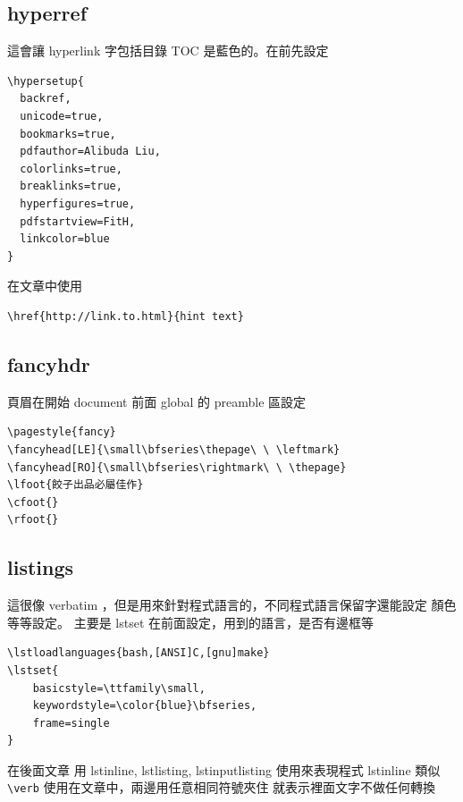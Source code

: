 \subsection{hyperref}
這會讓 hyperlink 字包括目錄 TOC 是藍色的。在\verb==前先設定
\begin{verbatim}
\hypersetup{
  backref,
  unicode=true,
  bookmarks=true,
  pdfauthor=Alibuda Liu,
  colorlinks=true,
  breaklinks=true,
  hyperfigures=true,
  pdfstartview=FitH,
  linkcolor=blue
}
\end{verbatim}
在文章中使用
\begin{verbatim}
\href{http://link.to.html}{hint text}
\end{verbatim}

\subsection{fancyhdr}
頁眉在開始 document 前面 global 的 preamble 區設定
\begin{verbatim}
\pagestyle{fancy}
\fancyhead[LE]{\small\bfseries\thepage\ \ \leftmark}
\fancyhead[RO]{\small\bfseries\rightmark\ \ \thepage}
\lfoot{餃子出品必屬佳作}
\cfoot{}
\rfoot{}
\end{verbatim}

\subsection{listings}
這很像 verbatim ，但是用來針對程式語言的，不同程式語言保留字還能設定
顏色等等設定。 主要是 lstset 在前面設定，用到的語言，是否有邊框等
\begin{verbatim}
\lstloadlanguages{bash,[ANSI]C,[gnu]make}
\lstset{
    basicstyle=\ttfamily\small,
    keywordstyle=\color{blue}\bfseries,
    frame=single
}
\end{verbatim}
在後面文章 用 lstinline, lstlisting, lstinputlisting 使用來表現程式
lstinline 類似 \verb=\verb= 使用在文章中，兩邊用任意相同符號夾住
就表示裡面文字不做任何轉換


